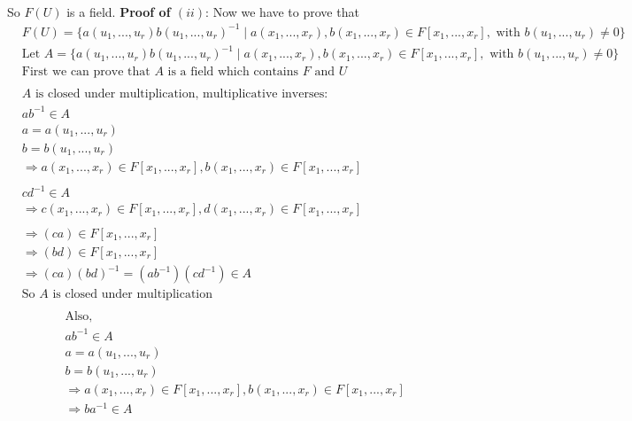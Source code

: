 \documentclass[11pt]{article}
\begin{document}
{\begin{align*}
\end{align*}
So $F(U)$ is a field.
\newline
\textbf{Proof of $(ii)$}:
\newline
Now we have to prove that 
\begin{align*}
&F(U) = \{a(u_1, ..., u_r)b(u_1, ..., u_r)^{-1} \mid a(x_1, ..., x_r), b(x_1, ..., x_r) \in F[x_1, ..., x_r], \text{ with } b(u_1, ..., u_r) \neq 0\}
\end{align*}
\begin{align*}
&\text{Let }A = \{a(u_1, ..., u_r)b(u_1, ..., u_r)^{-1} \mid a(x_1, ..., x_r), b(x_1, ..., x_r) \in F[x_1, ..., x_r], \text{ with } b(u_1, ..., u_r) \neq 0\}\\
&\text{First we can prove that $A$ is a field which contains $F$ and $U$}\\
&\\
&\text{$A$ is closed under multiplication, multiplicative inverses}:\\
&ab^{-1} \in A\\
&a = a(u_1, ..., u_r)\\
&b = b(u_1, ..., u_r)\\
&\Rightarrow a(x_1, ..., x_r) \in F[x_1, ..., x_r], b(x_1, ..., x_r) \in F[x_1, ..., x_r]\\
&\\
&cd^{-1} \in A\\
&\Rightarrow c(x_1, ..., x_r) \in F[x_1, ..., x_r], d(x_1, ..., x_r) \in F[x_1, ..., x_r]\\
&\\
&\Rightarrow (ca) \in F[x_1, ..., x_r]\\
&\Rightarrow (bd) \in F[x_1, ..., x_r]\\
&\Rightarrow (ca)(bd)^{-1} = (ab^{-1})(cd^{-1}) \in A\\
&\text{So $A$ is closed under multiplication}\\
\end{align*}
\begin{align*}
&\text{Also, } \\
&ab^{-1} \in A\\
&a = a(u_1, ..., u_r)\\
&b = b(u_1, ..., u_r)\\
&\Rightarrow a(x_1, ..., x_r) \in F[x_1, ..., x_r], b(x_1, ..., x_r) \in F[x_1, ..., x_r]\\
&\Rightarrow ba^{-1} \in A\\

\end{align*}}
\end{document}
